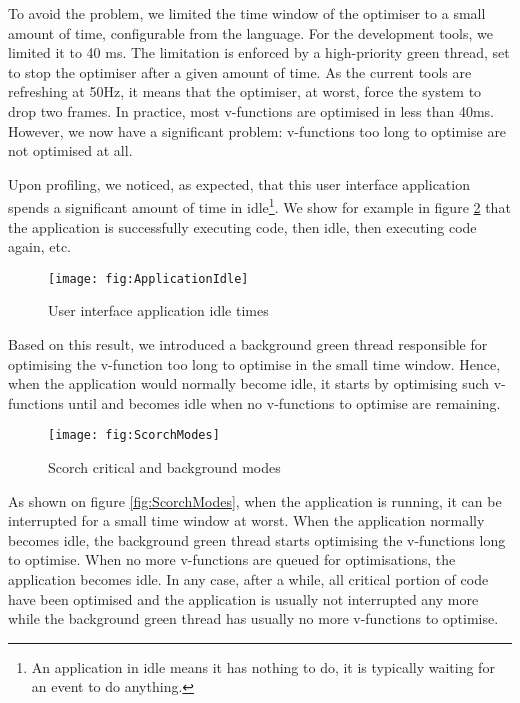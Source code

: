 \documentclass[a4paper,12pt,twoside]{../includes/ThesisStyle}
\begin{document}
To avoid the problem, we limited the time window of the optimiser to a small amount of time, configurable from the language. For the development tools, we limited it to 40 ms. The limitation is enforced by a high-priority green thread, set to stop the optimiser after a given amount of time. As the current tools are refreshing at 50Hz, it means that the optimiser, at worst, force the system to drop two frames. In practice, most v-functions are optimised in less than 40ms. However, we now have a significant problem: v-functions too long to optimise are not optimised at all.

Upon profiling, we noticed, as expected, that this user interface application spends a significant amount of time in idle\footnote{An application in idle means it has nothing to do, it is typically waiting for an event to do anything.}. We show for example in figure \ref{fig:ApplicationIdle} that the application is successfully executing code, then idle, then executing code again, etc. 

\begin{figure}[h!]
    \begin{center}
        \texttt{[image: fig:ApplicationIdle]}
        \caption{User interface application idle times}
        \label{fig:ApplicationIdle}
    \end{center}
\end{figure}

Based on this result, we introduced a background green thread responsible for optimising the v-function too long to optimise in the small time window. Hence, when the application would normally become idle, it starts by optimising such v-functions until and becomes idle when no v-functions to optimise are remaining.

\begin{figure}[h!]
    \begin{center}
        \texttt{[image: fig:ScorchModes]}
        \caption{Scorch critical and background modes}
        \label{fig:ApplicationIdle}
    \end{center}
\end{figure}

As shown on figure \ref{fig:ScorchModes}, when the application is running, it can be interrupted for a small time window at worst. When the application normally becomes idle, the background green thread starts optimising the v-functions long to optimise. When no more v-functions are queued for optimisations, the application becomes idle. In any case, after a while, all critical portion of code have been optimised and the application is usually not interrupted any more while the background green thread has usually no more v-functions to optimise.
\end{document}
